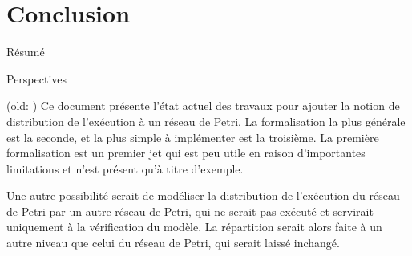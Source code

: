 \chapter*{Conclusion}
Résumé

Perspectives


(old: )
Ce document présente l'état actuel des travaux pour ajouter la notion de distribution de l'exécution à un réseau de Petri. La formalisation la plus générale est la seconde, et la plus simple à implémenter est la troisième. La première formalisation est un premier jet qui est peu utile en raison d'importantes limitations et n'est présent qu'à titre d'exemple.

Une autre possibilité serait de modéliser la distribution de l'exécution du réseau de Petri par un autre réseau de Petri, qui ne serait pas exécuté et servirait uniquement à la vérification du modèle.
La répartition serait alors faite à un autre niveau que celui du réseau de Petri, qui serait laissé inchangé.